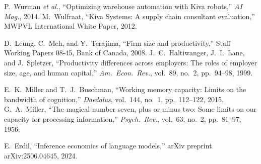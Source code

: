 \documentclass[10pt,conference]{IEEEtran}
\begin{document}
\begin{thebibliography}{25}
 P.~Wurman \emph{et al.}, ``Optimizing warehouse automation with Kiva robots,'' \emph{AI Mag.}, 2014.
 M.~Wulfraat, ``Kiva Systems: A supply chain consultant evaluation,'' MWPVL International White Paper, 2012.

 D.~Leung, C.~Meh, and Y.~Terajima, ``Firm size and productivity,'' Staff Working Papers 08-45, Bank of Canada, 2008.
 J.~C.~Haltiwanger, J.~I.~Lane, and J.~Spletzer, ``Productivity differences across employers: The roles of employer size, age, and human capital,'' \emph{Am.\ Econ.\ Rev.}, vol.~89, no.~2, pp.~94--98, 1999.

 E.~K.~Miller and T.~J.~Buschman, ``Working memory capacity: Limits on the bandwidth of cognition,'' \emph{Daedalus}, vol.~144, no.~1, pp.~112--122, 2015.
 G.~A.~Miller, ``The magical number seven, plus or minus two: Some limits on our capacity for processing information,'' \emph{Psych.\ Rev.}, vol.~63, no.~2, pp.~81--97, 1956.

 E.~Erdil, ``Inference economics of language models,'' arXiv preprint arXiv:2506.04645, 2024.

\end{thebibliography}
\end{document}
